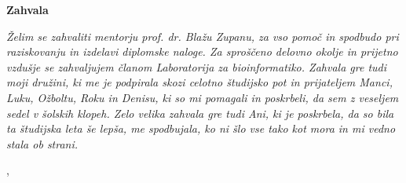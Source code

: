 \thispagestyle{empty}

\begin{center}
{\Large \textbf{\sc Zahvala}}
\end{center}
\vspace{0.5cm}

{\it\noindent
Želim se zahvaliti mentorju prof. dr. Blažu Zupanu, za vso pomoč in spodbudo pri raziskovanju in izdelavi diplomske naloge. Za sproščeno delovno okolje in prijetno vzdušje se zahvaljujem članom Laboratorija za bioinformatiko. Zahvala gre tudi moji družini, ki me je podpirala skozi celotno študijsko pot in prijateljem Manci, Luku, Ožboltu, Roku in Denisu, ki so mi pomagali in poskrbeli, da sem z veseljem sedel v šolskih klopeh.
Zelo velika zahvala gre tudi Ani, ki je poskrbela, da so bila ta študijska leta še lepša, me spodbujala, ko ni šlo vse tako kot mora in mi vedno stala ob strani.

\vspace{0.5cm} \hfill \tauthor, \myyear
}